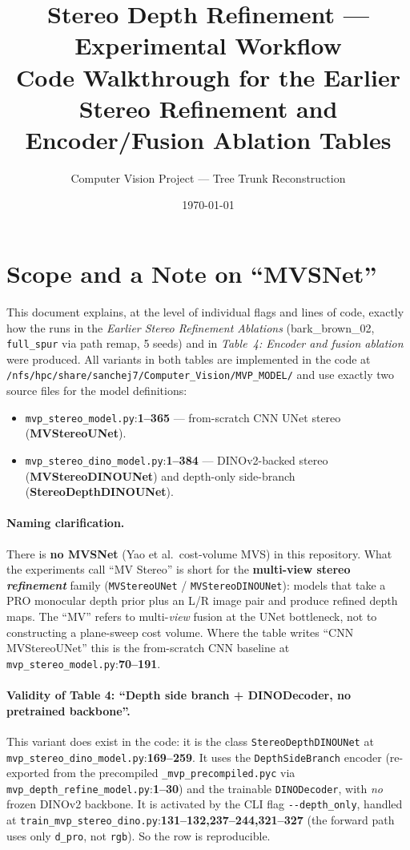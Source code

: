\documentclass[11pt]{article}
\title{\textbf{Stereo Depth Refinement --- Experimental Workflow}\\
\large Code Walkthrough for the Earlier Stereo Refinement and
Encoder/Fusion Ablation Tables}
\author{Computer Vision Project --- Tree Trunk Reconstruction}
\date{\today}
\newcommand{\fref}[2]{\texttt{\textcolor{filegray}{#1}}:\textbf{#2}}
\begin{document}
\maketitle
\tableofcontents
\newpage

\section{Scope and a Note on ``MVSNet''}

This document explains, at the level of individual flags and lines of code,
exactly how the runs in the \emph{Earlier Stereo Refinement Ablations}
(bark\_brown\_02, \texttt{full\_spur} via path remap, 5 seeds) and in
\emph{Table~4: Encoder and fusion ablation} were produced. All variants in
both tables are implemented in the code at
\texttt{/nfs/hpc/share/sanchej7/Computer\_Vision/MVP\_MODEL/} and use exactly
two source files for the model definitions:
\begin{itemize}[leftmargin=2em]
  \item \fref{mvp\_stereo\_model.py}{1--365} --- from-scratch CNN UNet
        stereo (\textbf{MVStereoUNet}).
  \item \fref{mvp\_stereo\_dino\_model.py}{1--384} --- DINOv2-backed stereo
        (\textbf{MVStereoDINOUNet}) and depth-only side-branch
        (\textbf{StereoDepthDINOUNet}).
\end{itemize}

\paragraph{\textcolor{warnred}{Naming clarification.}}
There is \textbf{no MVSNet} (Yao et al.\ cost-volume MVS) in this repository.
What the experiments call ``MV Stereo'' is short for the
\textbf{multi-view stereo \emph{refinement}} family
(\texttt{MVStereoUNet} / \texttt{MVStereoDINOUNet}): models that take a
PRO monocular depth prior plus an L/R image pair and produce refined depth
maps. The ``MV'' refers to multi-\emph{view} fusion at the UNet bottleneck,
not to constructing a plane-sweep cost volume. Where the table writes
``CNN MVStereoUNet'' this is the from-scratch CNN baseline at
\fref{mvp\_stereo\_model.py}{70--191}.

\paragraph{Validity of Table 4: ``Depth side branch + DINODecoder, no
pretrained backbone''.}
This variant does exist in the code: it is the class
\texttt{StereoDepthDINOUNet} at
\fref{mvp\_stereo\_dino\_model.py}{169--259}. It uses the
\texttt{DepthSideBranch} encoder (re-exported from the precompiled
\texttt{\_mvp\_precompiled.pyc} via
\fref{mvp\_depth\_refine\_model.py}{1--30}) and the trainable
\texttt{DINODecoder}, with \emph{no} frozen DINOv2 backbone. It is
activated by the CLI flag \texttt{-{}-depth\_only}, handled at
\fref{train\_mvp\_stereo\_dino.py}{131--132,237--244,321--327} (the forward
path uses only \texttt{d\_pro}, not \texttt{rgb}). So the row is
reproducible.
\end{document}
